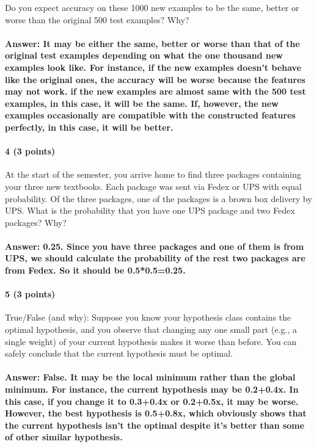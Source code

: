 \documentclass[11pt]{article}
\begin{document}
Do you expect accuracy on these 1000 new examples to be the same, better or worse than the original 500 test examples? Why?
\paragraph{\textbf{Answer:} It may be either the same, better or worse than that of the original test examples depending on what the one thousand new examples look like. For instance, if the new examples doesn't behave like the original ones, the accuracy will be worse because the features may not work. if the new examples are almost same with the 500 test examples, in this case, it will be the same. If, however, the new examples occasionally are compatible with the constructed features perfectly, in this case, it will be better.
}

\paragraph{4 (3 points)} At the start of the semester, you arrive home to find three packages containing your three new textbooks. Each package was sent via Fedex or UPS with equal probability. Of the three packages, one of the packages is a brown box delivery by UPS. What is 
the probability that you have one UPS package and two Fedex packages? Why?
\paragraph{\textbf{Answer:} 0.25. Since you have three packages and one of them is from UPS, we should calculate the probability of the rest two packages are from Fedex. So it should be 0.5*0.5=0.25.
}

\paragraph{5 (3 points)} 
True/False (and why): Suppose you know your hypothesis class contains the optimal hypothesis, and you observe that changing any one small part (e.g., a single weight) of your current hypothesis makes it worse than before. You can safely conclude that the current hypothesis must be optimal.
\paragraph{\textbf{Answer:} False. It may be the local minimum rather than the global minimum. For instance, the current hypothesis may be 0.2+0.4x. In this case, if you change it to 0.3+0.4x or 0.2+0.5x, it may be worse. However, the best hypothesis is 0.5+0.8x, which obviously shows that the current hypothesis isn't the optimal despite it's better than some of other similar hypothesis.}
\end{document}
